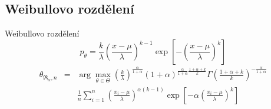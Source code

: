 \documentclass[11pt,a4paper]{beamer}
\newcommand{\amtiT}{\arg \max_{\theta \in \Theta}}
\newcommand{\fa}{\frac{\alpha}{1+\alpha}}
\begin{document}

\subsection{Weibullovo rozdělení}
\begin{frame}{Weibullovo rozdělení} %
	\begin{equation*}
		p_\theta =  \frac{k}{\lambda} \left( \frac{x-\mu}{\lambda} \right)^{k-1} \exp \left[ -\left( \frac{x-\mu}{\lambda} \right)^k \right] 
	\end{equation*}
	\begin{eqnarray}
		\theta_{\mathfrak{R}_\alpha,n} & = & \amtiT \left( \frac{k}{\lambda} \right)^\fa (1+\alpha)^{\fa\frac{1+\alpha+k}{k}} \Gamma\left(\frac{1+\alpha+k}{k}\right)^{-\fa} \nonumber \\
							&& \frac{1}{n}\sum_{i=1}^n \left( \frac{x_i-\mu}{\lambda}\right)^{\alpha(k-1)} \exp\left[-\alpha \left(\frac{x_i-\mu}{\lambda}\right)^k\right] \nonumber
	\end{eqnarray}
\end{frame}
\end{document}
